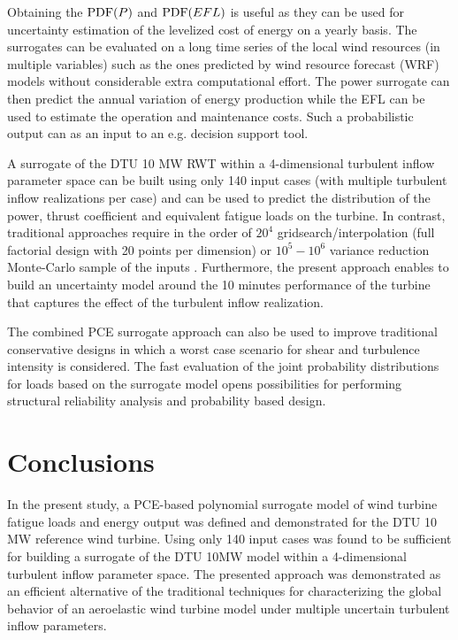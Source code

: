 \documentclass[preprint,12pt]{elsarticle}
\begin{document}
Obtaining the $\mathrm{PDF}(P)$ and $\mathrm{PDF}(EFL)$ is useful as they can be used for uncertainty estimation of the levelized cost of energy on a yearly basis. The surrogates can be evaluated on a long time series of the local wind resources (in multiple variables) such as the ones predicted by wind resource forecast (WRF) models without considerable extra computational effort. The power surrogate can then predict the annual variation of energy production while the EFL can be used to estimate the operation and maintenance costs. Such a probabilistic output can as an input to an e.g. decision support tool.

A surrogate of the DTU 10 MW RWT within a 4-dimensional turbulent inflow parameter space can be built using only 140 input cases (with multiple turbulent inflow realizations per case) and can be used to predict the distribution of the power, thrust coefficient and equivalent fatigue loads on the turbine. In contrast, traditional approaches require in the order of $20^4$ gridsearch/interpolation (full factorial design with  20 points per dimension) or $10^5-10^6$ variance reduction Monte-Carlo sample of the inputs \cite{dimitrov2015model}. Furthermore, the present approach enables to build an uncertainty model around the 10 minutes performance of the turbine that captures the effect of the turbulent inflow realization.

The combined PCE surrogate approach can also be used to improve traditional conservative designs in which a worst case scenario for shear and turbulence intensity is considered. The fast evaluation of the joint probability distributions for loads based on the surrogate model opens possibilities for performing structural reliability analysis and probability based design.

\section{Conclusions}

In the present study, a PCE-based polynomial surrogate model of wind turbine fatigue loads and energy output was defined and demonstrated for the DTU 10 MW reference wind turbine.
Using only 140 input cases was found to be sufficient for building a surrogate of the DTU 10MW model within a 4-dimensional turbulent inflow parameter space. The presented approach was demonstrated as an efficient alternative of the traditional techniques for characterizing the global behavior of an aeroelastic wind turbine model under multiple uncertain turbulent inflow parameters. %
 
\end{document}
